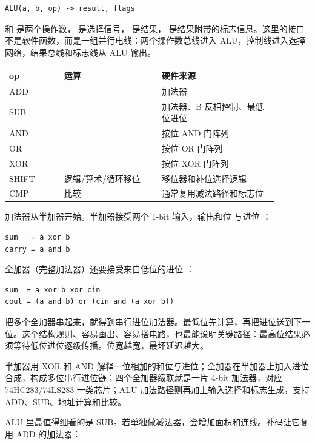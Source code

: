\begin{lstlisting}
ALU(a, b, op) -> result, flags
\end{lstlisting}

 和  是两个操作数， 是选择信号， 是结果， 是结果附带的标志信息。这里的接口不是软件函数，而是一组并行电线：两个操作数总线进入 ALU，控制线进入选择网络，结果总线和标志线从 ALU 输出。

\begin{longtable}{L{0.18\linewidth}L{0.32\linewidth}L{0.38\linewidth}}
\toprule
op & 运算 & 硬件来源 \\
\midrule
ADD &  & 加法器 \\
SUB &  & 加法器、B 反相控制、最低位进位 \\
AND &  & 按位 AND 门阵列 \\
OR &  & 按位 OR 门阵列 \\
XOR &  & 按位 XOR 门阵列 \\
SHIFT & 逻辑/算术/循环移位 & 移位器和补位选择逻辑 \\
CMP & 比较 & 通常复用减法路径和标志位 \\
\bottomrule
\end{longtable}

加法器从半加器开始。半加器接受两个 1-bit 输入，输出和位  与进位 ：

\begin{lstlisting}
sum   = a xor b
carry = a and b
\end{lstlisting}

全加器（完整加法器）还要接受来自低位的进位 ：

\begin{lstlisting}
sum  = a xor b xor cin
cout = (a and b) or (cin and (a xor b))
\end{lstlisting}

把多个全加器串起来，就得到串行进位加法器。最低位先计算，再把进位送到下一位。这个结构规则、容易画出、容易搭电路，也最能说明关键路径：最高位结果必须等待低位进位逐级传播。位宽越宽，最坏延迟越大。

半加器用 XOR 和 AND 解释一位相加的和位与进位；全加器在半加器上加入进位合成，构成多位串行进位链；四个全加器级联就是一片 4-bit 加法器，对应 74HC283/74LS283 一类芯片；ALU 加法路径则再加上输入选择和标志生成，支持 ADD、SUB、地址计算和比较。

ALU 里最值得细看的是 SUB。若单独做减法器，会增加面积和连线。补码让它复用 ADD 的加法器：

